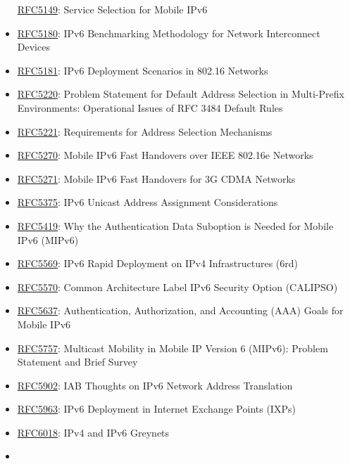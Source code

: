 \documentclass[
]{article}
\begin{document}
\begin{itemize}
  \href{https://www.rfc-editor.org/info/rfc5149}{RFC5149}: Service
  Selection for Mobile IPv6
\item
  \href{https://www.rfc-editor.org/info/rfc5180}{RFC5180}: IPv6
  Benchmarking Methodology for Network Interconnect Devices
\item
  \href{https://www.rfc-editor.org/info/rfc5181}{RFC5181}: IPv6
  Deployment Scenarios in 802.16 Networks
\item
  \href{https://www.rfc-editor.org/info/rfc5220}{RFC5220}: Problem
  Statement for Default Address Selection in Multi-Prefix Environments:
  Operational Issues of RFC 3484 Default Rules
\item
  \href{https://www.rfc-editor.org/info/rfc5221}{RFC5221}: Requirements
  for Address Selection Mechanisms
\item
  \href{https://www.rfc-editor.org/info/rfc5270}{RFC5270}: Mobile IPv6
  Fast Handovers over IEEE 802.16e Networks
\item
  \href{https://www.rfc-editor.org/info/rfc5271}{RFC5271}: Mobile IPv6
  Fast Handovers for 3G CDMA Networks
\item
  \href{https://www.rfc-editor.org/info/rfc5375}{RFC5375}: IPv6 Unicast
  Address Assignment Considerations
\item
  \href{https://www.rfc-editor.org/info/rfc5419}{RFC5419}: Why the
  Authentication Data Suboption is Needed for Mobile IPv6 (MIPv6)
\item
  \href{https://www.rfc-editor.org/info/rfc5569}{RFC5569}: IPv6 Rapid
  Deployment on IPv4 Infrastructures (6rd)
\item
  \href{https://www.rfc-editor.org/info/rfc5570}{RFC5570}: Common
  Architecture Label IPv6 Security Option (CALIPSO)
\item
  \href{https://www.rfc-editor.org/info/rfc5637}{RFC5637}:
  Authentication, Authorization, and Accounting (AAA) Goals for Mobile
  IPv6
\item
  \href{https://www.rfc-editor.org/info/rfc5757}{RFC5757}: Multicast
  Mobility in Mobile IP Version 6 (MIPv6): Problem Statement and Brief
  Survey
\item
  \href{https://www.rfc-editor.org/info/rfc5902}{RFC5902}: IAB Thoughts
  on IPv6 Network Address Translation
\item
  \href{https://www.rfc-editor.org/info/rfc5963}{RFC5963}: IPv6
  Deployment in Internet Exchange Points (IXPs)
\item
  \href{https://www.rfc-editor.org/info/rfc6018}{RFC6018}: IPv4 and IPv6
  Greynets
\item

\end{itemize}
\end{document}
